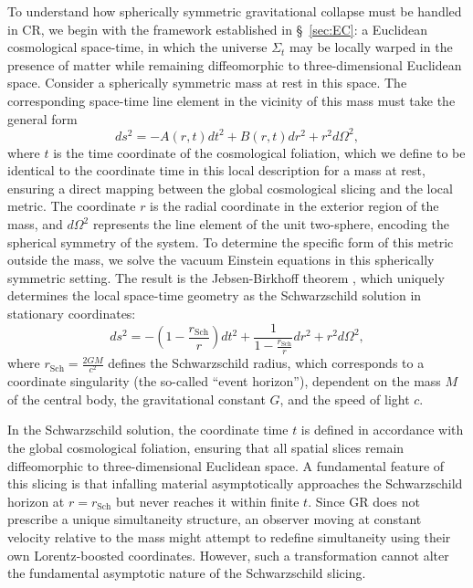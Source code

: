 \documentclass[aps,prd,reprint,superscriptaddress]{revtex4-2}
\begin{document}
To understand how spherically symmetric gravitational collapse must be handled in CR, we begin with the framework established in \S~\ref{sec:EC}: a Euclidean cosmological space-time, in which the universe $\Sigma_t$ may be locally warped in the presence of matter while remaining diffeomorphic to three-dimensional Euclidean space. Consider a spherically symmetric mass at rest in this space. The corresponding space-time line element in the vicinity of this mass must take the general form
\begin{equation} 
    ds^2=-A(r,t)dt^2+B(r,t)dr^2+r^2d\Omega^2, 
    \label{eq:JB1} 
\end{equation}
where $t$ is the time coordinate of the cosmological foliation, which we define to be identical to the coordinate time in this local description for a mass at rest, ensuring a direct mapping between the global cosmological slicing and the local metric. The coordinate $r$ is the radial coordinate in the exterior region of the mass, and $d\Omega^2$ represents the line element of the unit two-sphere, encoding the spherical symmetry of the system. To determine the specific form of this metric outside the mass, we solve the vacuum Einstein equations in this spherically symmetric setting. The result is the Jebsen-Birkhoff theorem \cite{Jebsen1921,Jebsen2005,Birkhoff1923}, which uniquely determines the local space-time geometry as the Schwarzschild solution in stationary coordinates:
\begin{equation} 
    ds^2=-\left(1-\frac{r_{\mathrm{Sch}}}{r}\right)dt^2+\frac{1}{1-\frac{r_{\mathrm{Sch}}}{r}}dr^2+r^2d\Omega^2, 
    \label{eq:Sch} 
\end{equation}
where $r_{\mathrm{Sch}} = \frac{2GM}{c^2}$ defines the Schwarzschild radius, which corresponds to a coordinate singularity (the so-called ``event horizon''), dependent on the mass $M$ of the central body, the gravitational constant $G$, and the speed of light $c$.

In the Schwarzschild solution, the coordinate time $t$ is defined in accordance with the global cosmological foliation, ensuring that all spatial slices remain diffeomorphic to three-dimensional Euclidean space. A fundamental feature of this slicing is that infalling material asymptotically approaches the Schwarzschild horizon at $r = r_{\mathrm{Sch}}$ but never reaches it within finite $t$. Since GR does not prescribe a unique simultaneity structure, an observer moving at constant velocity relative to the mass might attempt to redefine simultaneity using their own Lorentz-boosted coordinates. However, such a transformation cannot alter the fundamental asymptotic nature of the Schwarzschild slicing.
\end{document}
